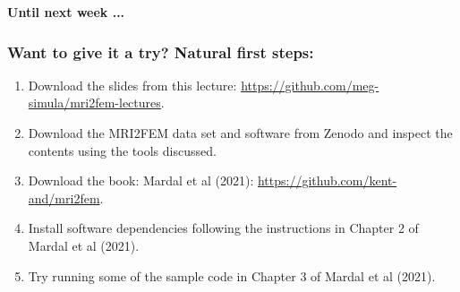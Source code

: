 \documentclass[mathserif, aspectratio=169]{beamer}
\newcommand{\mysection}[1]{\begin{frame} \begin{center} \vspace{3em} \textbf{#1} \end{center} \end{frame}}
\begin{document}
\mysection{Until next week ...}
 
\begin{frame}
\frametitle{Want to give it a try? Natural first steps:}
\begin{enumerate}
\item
  Download the slides from this lecture:  \href{https://github.com/meg-simula/mri2fem-lectures}{https://github.com/meg-simula/mri2fem-lectures}.
\item
  Download the MRI2FEM data set and software from Zenodo and inspect
  the contents using the tools discussed.
\item
  Download the book: Mardal et al (2021): \href{https://github.com/kent-and/mri2fem}{https://github.com/kent-and/mri2fem}.
\item
  Install software dependencies following the instructions in Chapter
  2 of Mardal et al (2021).
\item
  Try running some of the sample code in Chapter 3 of Mardal et al
  (2021).
\end{enumerate}
\end{frame}

\end{document}

